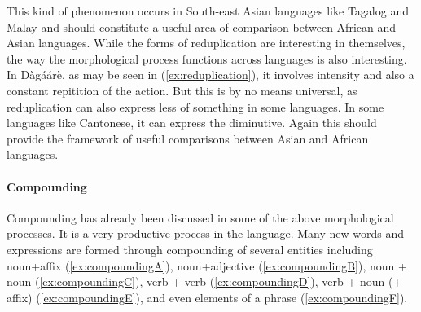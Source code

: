 \begin{refsection}
This kind of phenomenon occurs in South-east Asian languages like Tagalog and Malay and should constitute a useful area of comparison between African and Asian languages. While the forms of reduplication are interesting in themselves, the way the
morphological process functions across languages is also interesting. In Dàgáárè, as may be
seen in (\ref{ex:reduplication}), it involves intensity and also a constant repitition of the action. But this is by no
means universal, as reduplication can also express less of something in some languages. In
some languages like Cantonese, it can express the diminutive. Again this should provide the
framework of useful comparisons between Asian and African languages.

\paragraph{Compounding}
Compounding has already been discussed in some of the above morphological
processes. It is a very productive process in the language. Many new words and expressions are formed through compounding of several entities including noun+affix (\ref{ex:compoundingA}),
noun+adjective (\ref{ex:compoundingB}), noun + noun (\ref{ex:compoundingC}), verb + verb (\ref{ex:compoundingD}), verb + noun (+ affix) (\ref{ex:compoundingE}), and
even elements of a phrase (\ref{ex:compoundingF}).


\end{refsection}
